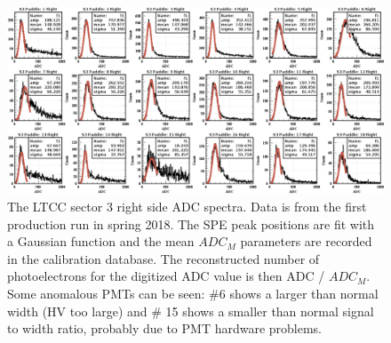 \begin{figure}
	\centering
	\includegraphics[width=2.1\columnwidth,keepaspectratio]{img/spe.png}
	\caption{The LTCC sector 3 right side ADC spectra. Data is from the first production run in spring 2018.
          The SPE peak positions are fit with a Gaussian function and the mean $ADC_M$ parameters are recorded
          in the calibration database. The reconstructed number of photoelectrons for the digitized ADC value is
          then ADC / $ADC_M$. Some anomalous PMTs can be seen: \#6 shows a larger than normal width (HV too large)
          and \# 15 shows a smaller than normal signal to width ratio, probably due to PMT hardware problems.}
	\label{fig:speCalibration}
\end{figure}
